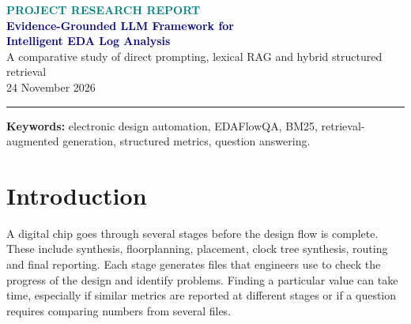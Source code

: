 \documentclass[11pt,a4paper]{article}
\begin{document}
\thispagestyle{plain}
\begin{center}
{\small\bfseries\textcolor{teal}{PROJECT RESEARCH REPORT}}\\[8pt]
{\LARGE\bfseries\textcolor{navy}{Evidence-Grounded LLM Framework for\\ Intelligent EDA Log Analysis}}\\[6pt]
{\large A comparative study of direct prompting, lexical RAG and hybrid structured retrieval}\\[9pt]
{\small 24 November 2026}
\end{center}
\vspace{2pt}\hrule\vspace{5pt}
\begin{abstract}
Electronic design automation (EDA) tools generate many logs containing timing, power, area and execution information. Finding answers in these files can be difficult, especially when a question involves several reports. In this project, we use NVIDIA's EDAFlowQA benchmark to compare three methods: Direct prompting with limited raw log context, Standard retrieval-augmented generation (RAG) using BM25, and Hybrid RAG using both logs and structured metrics. We also implemented a Python calculator for Hybrid. We tested Qwen3-4B locally on 40 questions across three designs, giving 120 attempts in total. Direct, RAG and Hybrid achieved full-answer accuracies of 2.5\%, 7.5\% and 17.5\%, respectively. Hybrid used more tokens and took longer than RAG. In an earlier, incomplete GPT-OSS-20B experiment on Groq, Hybrid was again the most accurate, but used fewer tokens and responded faster. Neither run recorded a successful calculator trace or a fully correct answer in the two complex question categories. These results show where structured retrieval helps and where the system still needs improvement.
\end{abstract}
\textbf{Keywords:} electronic design automation, EDAFlowQA, BM25, retrieval-augmented generation, structured metrics, question answering.

\section{Introduction}
A digital chip goes through several stages before the design flow is complete. These include synthesis, floorplanning, placement, clock tree synthesis, routing and final reporting. Each stage generates files that engineers use to check the progress of the design and identify problems. Finding a particular value can take time, especially if similar metrics are reported at different stages or if a question requires comparing numbers from several files.
\end{document}
